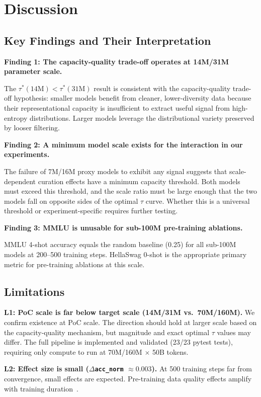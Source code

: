 \section{Discussion}
\label{sec:discussion}

\subsection{Key Findings and Their Interpretation}

\textbf{Finding 1: The capacity-quality trade-off operates at 14M/31M parameter scale.}

The $\tau^*(14\text{M}) < \tau^*(31\text{M})$ result is consistent with the capacity-quality trade-off hypothesis: smaller models benefit from cleaner, lower-diversity data because their representational capacity is insufficient to extract useful signal from high-entropy distributions. Larger models leverage the distributional variety preserved by looser filtering.

\textbf{Finding 2: A minimum model scale exists for the interaction in our experiments.}

The failure of 7M/16M proxy models to exhibit any signal suggests that scale-dependent curation effects have a minimum capacity threshold. Both models must exceed this threshold, and the scale ratio must be large enough that the two models fall on opposite sides of the optimal $\tau$ curve. Whether this is a universal threshold or experiment-specific requires further testing.

\textbf{Finding 3: MMLU is unusable for sub-100M pre-training ablations.}

MMLU 4-shot accuracy equals the random baseline (0.25) for all sub-100M models at 200--500 training steps. HellaSwag 0-shot is the appropriate primary metric for pre-training ablations at this scale.

\subsection{Limitations}

\textbf{L1: PoC scale is far below target scale (14M/31M vs.\ 70M/160M).}
We confirm existence at PoC scale. The direction should hold at larger scale based on the capacity-quality mechanism, but magnitude and exact optimal $\tau$ values may differ. The full pipeline is implemented and validated (23/23 pytest tests), requiring only compute to run at 70M/160M $\times$ 50B tokens.

\textbf{L2: Effect size is small ($\Delta$\texttt{acc\_norm} $\approx 0.003$).}
At 500 training steps far from convergence, small effects are expected. Pre-training data quality effects amplify with training duration~\cite{Zhou2024ProX,Nguyen2025REWIRE}.


